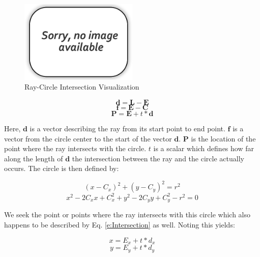 \documentclass[12pt,onecolumn]{report}
\begin{document}
\begin{figure}
	\centering
	\includegraphics[width=0.5\textwidth]{Figs/no-image.png}
	\caption{{\small Ray-Circle Intersection Visualization}}    
	\label{fig:RayCircleIntersection}
\end{figure}

\begin{equation}\label{e:RayVector}
\boldsymbol{d} = \boldsymbol{L} - \boldsymbol{E}
\end{equation}
\begin{equation}\label{e:CircleCenterVector}
\boldsymbol{f} = \boldsymbol{E} - \boldsymbol{C} 
\end{equation}
\begin{equation}\label{e:Intersection}
\boldsymbol{P} = \boldsymbol{E} + t*\boldsymbol{d}
\end{equation}

Here, $\boldsymbol{d}$ is a vector describing the ray from its start point to end point. $\boldsymbol{f}$ is a vector from the circle center to the start of the vector $\boldsymbol{d}$. $\boldsymbol{P}$ is the location of the point where the ray intersects with the circle. $t$ is a scalar which defines how far along the length of $\boldsymbol{d}$ the intersection between the ray and the circle actually occurs. The circle is then defined by:

\begin{equation}\label{e:Circle}
\left(x - C_{x}\right)^{2} +   \left(y - C_{y}\right)^{2} = r^2
\end{equation}
\begin{equation}\label{e:CircleExpanded}
x^2 - 2C_{x}x + C_{x}^{2} + y^2 - 2C_{y}y+ C_{y}^{2} - r^2 = 0
\end{equation}

We seek the point or points where the ray intersects with this circle which also happens to be described by Eq. \ref{e:Intersection} as well. Noting this yields:

\begin{equation}\label{e:XIntersection}
x = E_{x} + t*d_{x} 
\end{equation}
\begin{equation}\label{e:YIntersection}
y = E_{y} + t*d_{y} 
\end{equation}
\end{document}
